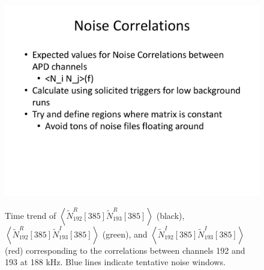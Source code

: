 \begin{figure}
\begin{center}
\includegraphics[keepaspectratio=true,page=6,width=\textwidth,clip=true,trim=0.2in 0.5in 0.5in 0.3in]{APD_Denoising_noise_correlations.pdf}
\end{center}
\renewcommand{\baselinestretch}{1}
\small\normalsize
\begin{quote}
\caption{Time trend of $\left<\widetilde{N}^R_{192}[385]\widetilde{N}^R_{193}[385]\right>$ (black), $\left<\widetilde{N}^R_{192}[385]\widetilde{N}^I_{193}[385]\right>$ (green), and $\left<\widetilde{N}^I_{192}[385]\widetilde{N}^I_{193}[385]\right>$ (red) corresponding to the correlations between channels 192 and 193 at 188 kHz.  Blue lines indicate tentative noise windows.~\cite{MikeCoherentAPDNoise}}
\label{fig:MikeNoise_192_193}
\end{quote}
\end{figure}
\renewcommand{\baselinestretch}{2}
\small\normalsize

